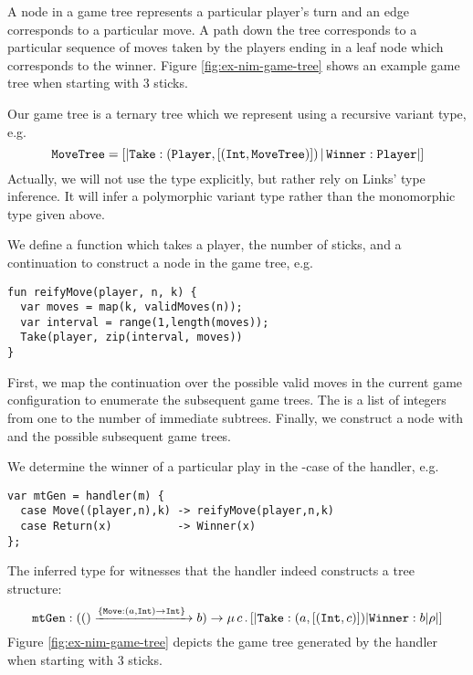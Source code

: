 \begin{example}\label{ex:nim-game-tree}
A node in a game tree represents a particular player's turn and an edge corresponds to a particular move. A path down the tree corresponds to a particular sequence of moves taken by the players ending in a leaf node which corresponds to the winner. Figure \ref{fig:ex-nim-game-tree} shows an example game tree when starting with 3 sticks.

Our game tree is a ternary tree which we represent using a recursive variant type, e.g.
\[ \type{MoveTree} = [|\type{Take}:(\type{Player},[(\type{Int},\type{MoveTree})])\,|\,\type{Winner}:\type{Player}|] \]
Actually, we will not use the type explicitly, but rather rely on Links' type inference. It will infer a polymorphic variant type rather than the monomorphic type given above.

We define a function  which takes a player, the number of sticks, and a continuation to construct a node in the game tree, e.g.
\begin{lstlisting}[style=links]
fun reifyMove(player, n, k) {
  var moves = map(k, validMoves(n));
  var interval = range(1,length(moves));
  Take(player, zip(interval, moves))
}
\end{lstlisting}
First, we map the continuation over the possible valid moves in the current game configuration to enumerate the subsequent game trees. The  is a list of integers from one to the number of immediate subtrees. Finally, we construct a node  with  and the possible subsequent game trees.

We determine the winner of a particular play in the -case of the handler, e.g.
\begin{lstlisting}[style=links]
var mtGen = handler(m) {
  case Move((player,n),k) -> reifyMove(player,n,k)
  case Return(x)          -> Winner(x)
};
\end{lstlisting}
The inferred type for  witnesses that the handler indeed constructs a tree structure:
\[ \code{mtGen} : (() \xrightarrow{\{\type{Move}:(a,\type{Int}) \to \type{Int}\}\;} b) \to \mu\, c\, . \, [|\type{Take}:(a, [(\type{Int}, c)])|\type{Winner}:b|\rho|] \]
Figure \ref{fig:ex-nim-game-tree} depicts the game tree generated by the handler when starting with 3 sticks.
\begin{figure}[H]
\begin{center}
\begin{tikzpicture}[level distance=1.5cm,
level 1/.style={sibling distance=3.5cm},
level 2/.style={sibling distance=2cm}]


\end{tikzpicture}
\end{center}
\end{figure}
\end{example}

